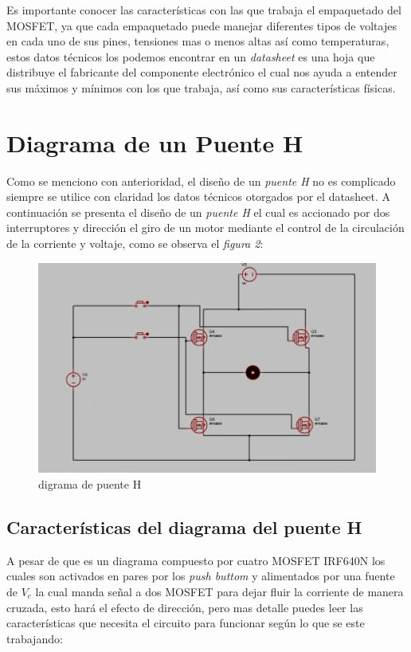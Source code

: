 \documentclass[11pt,a4paper]{article}
\begin{document}
Es importante conocer las características con las que trabaja el empaquetado del MOSFET, ya que cada empaquetado puede manejar diferentes tipos de voltajes en cada uno de sus pines, tensiones mas o menos altas así como temperaturas, estos datos técnicos los podemos encontrar en un \emph{datasheet} es una hoja que distribuye el fabricante del componente electrónico el cual nos ayuda a entender sus máximos y mínimos con los que trabaja, así como sus características físicas.

\section{Diagrama de un Puente H}

Como se menciono con anterioridad, el diseño de un \emph{puente H} no es complicado siempre se utilice con claridad los datos técnicos otorgados por el datasheet. A continuación se presenta el diseño de un \emph{puente H} el cual es accionado por dos interruptores y dirección el giro de un motor mediante el control de la circulación de la corriente y voltaje, como se observa el \emph{figura 2}:



\begin{figure}[h]
\begin{center}
\includegraphics[scale=0.5]{3.png}
\caption{digrama de puente H}
\end{center}
\end{figure}

\subsection{Características del diagrama del puente H}
A pesar de que es un diagrama compuesto por cuatro MOSFET IRF640N los cuales son activados en pares por los \emph{push buttom} y alimentados por una fuente de $V_c$ la cual manda señal a dos MOSFET para dejar fluir la corriente de manera cruzada, esto hará el efecto de dirección, pero mas detalle puedes leer las características que necesita el circuito para funcionar según lo que se este trabajando:
\end{document}
